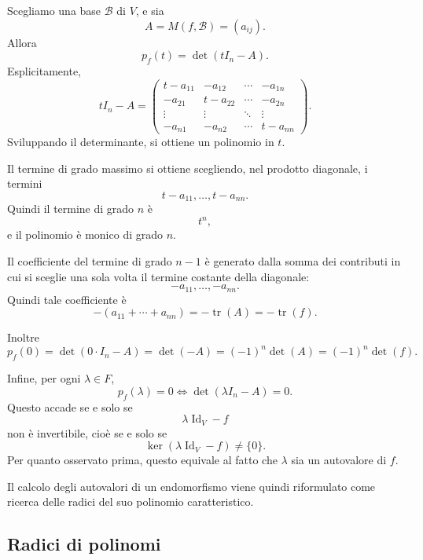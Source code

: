 \documentclass[a4paper]{article}
\begin{document}
\begin{snippetproof}{}
    Scegliamo una base \(\mathcal{B}\) di \(V\), e sia
    \[
        A=M(f,\mathcal{B})
        =
        (a_{ij}).
    \]
    Allora
    \[
        p_f(t)=\det(tI_n-A).
    \]
    Esplicitamente,
    \[
        tI_n-A
        =
        \begin{pmatrix}
            t-a_{11} & -a_{12} & \cdots & -a_{1n}\\
            -a_{21} & t-a_{22} & \cdots & -a_{2n}\\
            \vdots & \vdots & \ddots & \vdots\\
            -a_{n1} & -a_{n2} & \cdots & t-a_{nn}
        \end{pmatrix}.
    \]
    Sviluppando il determinante, si ottiene un polinomio in \(t\).

    Il termine di grado massimo si ottiene scegliendo, nel prodotto diagonale, i termini
    \[
        t-a_{11},\ldots,t-a_{nn}.
    \]
    Quindi il termine di grado \(n\) è
    \[
        t^n,
    \]
    e il polinomio è monico di grado \(n\).

    Il coefficiente del termine di grado \(n-1\) è generato dalla somma dei contributi in cui si sceglie una sola volta il termine costante della diagonale:
    \[
        -a_{11},\ldots,-a_{nn}.
    \]
    Quindi tale coefficiente è
    \[
        -(a_{11}+\cdots+a_{nn})
        =
        -\operatorname{tr}(A)
        =
        -\operatorname{tr}(f).
    \]

    Inoltre
    \[
        p_f(0)
        =
        \det(0\cdot I_n-A)
        =
        \det(-A)
        =
        (-1)^n\det(A)
        =
        (-1)^n\det(f).
    \]

    Infine, per ogni \(\lambda\in F\),
    \[
        p_f(\lambda)=0
        \Longleftrightarrow
        \det(\lambda I_n-A)=0.
    \]
    Questo accade se e solo se
    \[
        \lambda\operatorname{Id}_V-f
    \]
    non è invertibile, cioè se e solo se
    \[
        \ker(\lambda\operatorname{Id}_V-f)\neq\{0\}.
    \]
    Per quanto osservato prima, questo equivale al fatto che \(\lambda\) sia un autovalore di \(f\).
\end{snippetproof}

Il calcolo degli autovalori di un endomorfismo viene quindi riformulato come ricerca delle radici del suo polinomio caratteristico.

\subsection{Radici di polinomi}
\end{document}
